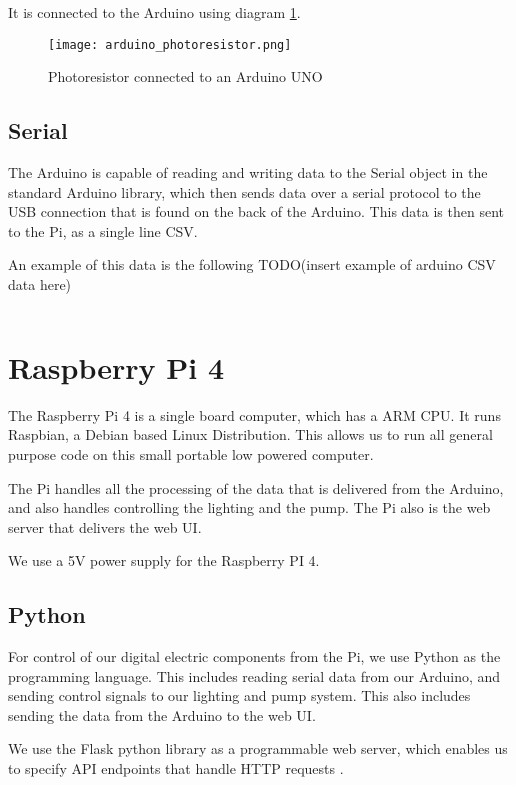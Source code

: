 \documentclass[a4paper,12pt,twoside,openright,titlepage]{book}
\begin{document}
It is connected to the Arduino using diagram \ref{diagram2}.

\begin{figure}[h]
    \texttt{[image: arduino\_photoresistor.png]}
    \caption{Photoresistor connected to an Arduino UNO \cite{photoresistor_arduino}}
    \label{diagram2}
\end{figure}

\subsection{Serial}
The Arduino is capable of reading and writing data to the Serial object in the standard Arduino library, which then sends data over a serial protocol to the USB connection that is found on the back of the Arduino.
This data is then sent to the Pi, as a single line CSV.

An example of this data is the following
TODO(insert example of arduino CSV data here)
\begin{verbatim}
\end{verbatim}

\section{Raspberry Pi 4}
The Raspberry Pi 4 is a single board computer, which has a ARM CPU.
It runs Raspbian, a Debian based Linux Distribution.
This allows us to run all general purpose code on this small portable low powered computer.

The Pi handles all the processing of the data that is delivered from the Arduino, and also handles controlling the lighting and the pump.
The Pi also is the web server that delivers the web UI.

We use a 5V power supply for the Raspberry PI 4.

\subsection{Python}
For control of our digital electric components from the Pi, we use Python as the programming language.
This includes reading serial data from our Arduino, and sending control signals to our lighting and pump system. This also includes sending the data from the Arduino to the web UI.

We use the Flask python library as a programmable web server, which enables us to specify API endpoints that handle HTTP requests \cite{flask}.
\end{document}
